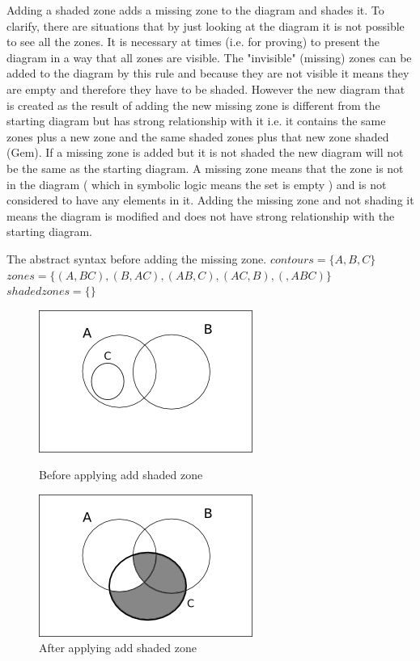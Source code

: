 \documentclass[a4paper]{article}
\begin{document}
Adding a shaded zone adds a missing zone to the diagram and shades it. To clarify, there are situations that by just looking at the diagram it is not possible to see all the zones. It is necessary at times (i.e. for proving) to present the diagram in a way that all zones are visible. The "invisible" (missing) zones can be added to the diagram by this rule and because they are not visible it means they are empty and therefore they have to be shaded. However the new diagram that is created as the result of adding the new missing zone is different from the starting diagram but has strong relationship with it  i.e. it contains the same zones plus a new zone and the same shaded zones plus that new zone shaded (Gem). If a missing zone is added but it is not shaded the new diagram will not be the same as the starting diagram. A missing zone means that the zone is not in the diagram ( which in symbolic logic means the set is empty ) and is not considered to have any elements in it. Adding the missing zone and not shading it means the diagram is modified and does not have strong relationship with the starting diagram. \newline

The abstract syntax before adding the missing zone.\newline
$contours =  \lbrace A, B, C \rbrace $ \newline
$zones = \lbrace (A , BC) , (B , AC), (AB , C) , (AC, B), (  , ABC) \rbrace  $ \newline 
$shaded zones = \lbrace \rbrace  $ \newline

\begin{figure}[h]
\begin{minipage}[h]{0.5\linewidth}
\centering
\includegraphics[scale=0.5]{images/d4sh1.png}
\caption{Before applying add shaded zone}
\label{fig:missing1}
\end{minipage}
\hspace{0.5cm}
\begin{minipage}[h]{0.5\linewidth}
\centering
\includegraphics[scale=0.5]{images/d4sh2.png}
\caption{After applying add shaded zone}
\label{fig:missing2}
\end{minipage}
\end{figure}
\end{document}
